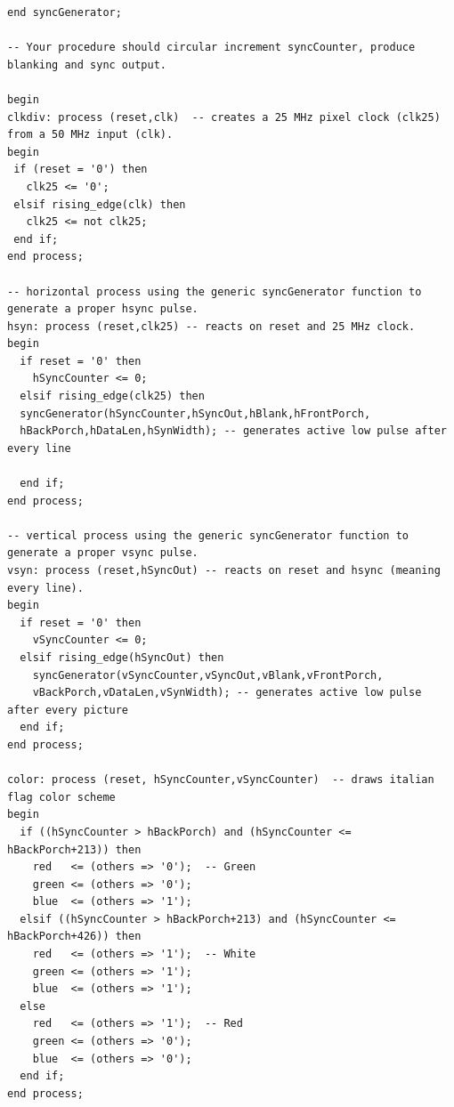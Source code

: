 \begin{enumerate}
\begin{lstlisting}[caption={syncGenerator Procedure Code},label={lst:Procedure_code}]
end syncGenerator;

-- Your procedure should circular increment syncCounter, produce blanking and sync output.  

begin
clkdiv: process (reset,clk)  -- creates a 25 MHz pixel clock (clk25) from a 50 MHz input (clk).
begin
 if (reset = '0') then
   clk25 <= '0';
 elsif rising_edge(clk) then
   clk25 <= not clk25;
 end if; 
end process;

-- horizontal process using the generic syncGenerator function to generate a proper hsync pulse.
hsyn: process (reset,clk25) -- reacts on reset and 25 MHz clock.
begin
  if reset = '0' then
    hSyncCounter <= 0;
  elsif rising_edge(clk25) then
  syncGenerator(hSyncCounter,hSyncOut,hBlank,hFrontPorch,
  hBackPorch,hDataLen,hSynWidth); -- generates active low pulse after every line
  
  end if;
end process;

-- vertical process using the generic syncGenerator function to generate a proper vsync pulse.
vsyn: process (reset,hSyncOut) -- reacts on reset and hsync (meaning every line).
begin
  if reset = '0' then
    vSyncCounter <= 0;
  elsif rising_edge(hSyncOut) then
    syncGenerator(vSyncCounter,vSyncOut,vBlank,vFrontPorch,
    vBackPorch,vDataLen,vSynWidth); -- generates active low pulse after every picture
  end if;
end process;

color: process (reset, hSyncCounter,vSyncCounter)  -- draws italian flag color scheme
begin
  if ((hSyncCounter > hBackPorch) and (hSyncCounter <= hBackPorch+213)) then
    red   <= (others => '0');  -- Green
    green <= (others => '0');
    blue  <= (others => '1');  
  elsif ((hSyncCounter > hBackPorch+213) and (hSyncCounter <= hBackPorch+426)) then
    red   <= (others => '1');  -- White
    green <= (others => '1');
    blue  <= (others => '1');
  else
    red   <= (others => '1');  -- Red
    green <= (others => '0');
    blue  <= (others => '0');   
  end if;
end process;


\end{lstlisting}
\end{enumerate}
